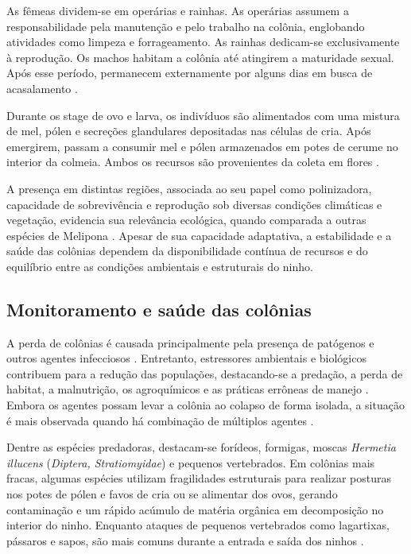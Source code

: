 \documentclass[12pt]{unisenaiclass}
\begin{document}
As fêmeas dividem-se em operárias e rainhas. As operárias assumem a responsabilidade pela manutenção e pelo trabalho na colônia, englobando atividades como limpeza e forrageamento. As rainhas dedicam-se exclusivamente à reprodução. Os machos habitam a colônia até atingirem a maturidade sexual. Após esse período, permanecem externamente por alguns dias em busca de acasalamento \cite{carvalhozilse2011meliponicultura}.

Durante os stage de ovo e larva, os indivíduos são alimentados com uma mistura de mel, pólen e secreções glandulares depositadas nas células de cria. Após emergirem, passam a consumir mel e pólen armazenados em potes de cerume no interior da colmeia. Ambos os recursos são provenientes da coleta em flores \cite{melo2009colorpattern}.

A presença em distintas regiões, associada ao seu papel como polinizadora, capacidade de sobrevivência e reprodução sob diversas condições climáticas e vegetação, evidencia sua relevância ecológica, quando comparada a outras espécies de Melipona \cite{melo2009colorpattern,pedro2014stingless}. Apesar de sua capacidade adaptativa, a estabilidade e a saúde das colônias dependem da disponibilidade contínua de recursos e do equilíbrio entre as condições ambientais e estruturais do ninho.

\subsection{Monitoramento e saúde das colônias}

A perda de colônias é causada principalmente pela presença de patógenos e outros agentes infecciosos \cite{evanshealth2011,schwarzpathosphere2015,caesargene2021}. Entretanto, estressores ambientais e biológicos contribuem para a redução das populações, destacando-se a predação, a perda de habitat, a malnutrição, os agroquímicos e as práticas errôneas de manejo \cite{goulsondeclines2015,davi1996biologia,caesargene2021}. Embora os agentes possam levar a colônia ao colapso de forma isolada, a situação é mais observada quando há combinação de múltiplos agentes \cite{brydenstress2013,caesargene2021}.

Dentre as espécies predadoras, destacam-se forídeos, formigas, moscas \textit{Hermetia illucens} (\textit{Diptera, Stratiomyidae}) e pequenos vertebrados. Em colônias mais fracas, algumas espécies utilizam fragilidades estruturais para realizar posturas nos potes de pólen e favos de cria ou se alimentar dos ovos, gerando contaminação e um rápido acúmulo de matéria orgânica em decomposição no interior do ninho. Enquanto ataques de pequenos vertebrados como lagartixas, pássaros e sapos, são mais comuns durante a entrada e saída dos ninhos \cite{pereiramanejo2012}.
\end{document}
